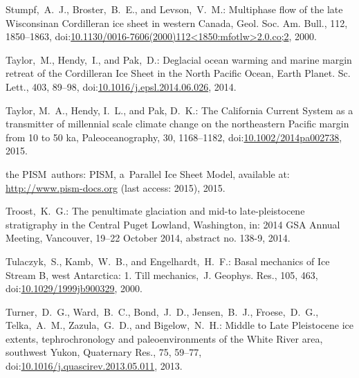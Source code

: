 \documentclass[tc, manuscript]{copernicus}
\begin{document}
\begin{thebibliography}{114}
Stumpf,~A.~J., Broster,~B.~E., and Levson,~V.~M.: Multiphase flow of the late Wisconsinan Cordilleran ice sheet in western Canada, Geol. Soc. Am. Bull., 112, 1850--1863,
doi:\href{http://dx.doi.org/10.1130/0016-7606(2000)112<1850:mfotlw>2.0.co;2}{10.1130/0016-7606(2000)112\textless1850:mfotlw\textgreater2.0.co;2}, 2000.


Taylor,~M., Hendy,~I., and Pak,~D.: Deglacial ocean warming and marine margin retreat of the Cordilleran Ice Sheet in the North Pacific Ocean, Earth Planet. Sc. Lett., 403, 89--98,
doi:\href{http://dx.doi.org/10.1016/j.epsl.2014.06.026}{10.1016/j.epsl.2014.06.026}, 2014.


Taylor, M.~A., Hendy, I.~L., and Pak, D.~K.: The California Current System as a transmitter of millennial scale climate change on the northeastern Pacific margin from 10 to 50 ka, Paleoceanography, 30, 1168--1182,
doi:\href{http://dx.doi.org/10.1002/2014pa002738}{10.1002/2014pa002738}, 2015.


the PISM~authors: {PISM}, a~{P}arallel {I}ce {S}heet {M}odel, available at:
\url{http://www.pism-docs.org} (last access: 2015), 2015.


Troost,~K.~G.: The penultimate glaciation and mid-to late-pleistocene
stratigraphy in the Central Puget Lowland, Washington, in: 2014 GSA Annual
Meeting, Vancouver, 19--22 October 2014, abstract no. 138-9, 2014.


Tulaczyk,~S., Kamb,~W.~B., and Engelhardt,~H.~F.: Basal mechanics of Ice Stream B, west Antarctica: 1. Till mechanics,~J. Geophys. Res., 105, 463,
doi:\href{http://dx.doi.org/10.1029/1999jb900329}{10.1029/1999jb900329}, 2000.


Turner,~D.~G., Ward,~B.~C., Bond,~J.~D., Jensen,~B.~J., Froese,~D.~G., Telka,~A.~M., Zazula,~G.~D., and Bigelow,~N.~H.: Middle to Late Pleistocene ice extents, tephrochronology and paleoenvironments of the White River area, southwest Yukon, Quaternary Res., 75, 59--77,
doi:\href{http://dx.doi.org/10.1016/j.quascirev.2013.05.011}{10.1016/j.quascirev.2013.05.011}, 2013.



\end{thebibliography}
\end{document}
